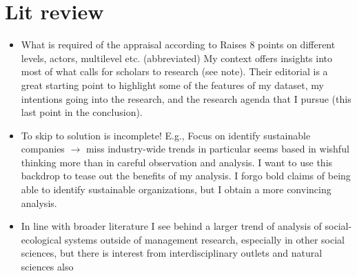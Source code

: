 	\section{Lit review}
	\begin{paracol}{2}
	\begin{itemize}
		\item What is required of the appraisal according to \citet{George2016}
			\subitem Raises 8 points on different levels, actors, multilevel etc.
				\subsubitem (abbreviated)
		\switchcolumn My context offers insights into most of what \citet{George2016} calls for scholars to research (see note). Their editorial is a great starting point to highlight some of the features of my dataset, my intentions going into the research, and the research agenda that I pursue (this last point in the conclusion).
		\switchcolumn*
		
		\item To skip to solution is incomplete!
			\subitem E.g., \citet{Ferraro2015, Slawinski2015}
			\subitem Focus on identify sustainable companies $\rightarrow$ miss industry-wide trends
		\switchcolumn \citet{Ferraro2015} in particular seems based in wishful thinking more than in careful observation and analysis. I want to use this backdrop to tease out the benefits of my analysis. I forgo bold claims of being able to identify sustainable organizations, but I obtain a more convincing analysis.
		\switchcolumn*
			
		\item In line with broader literature \citep{Reyers2018}
		\switchcolumn I see behind \citet{George2016} a larger trend of analysis of social-ecological systems outside of management research, especially in other social sciences, but there is interest from interdisciplinary outlets and natural sciences also \citep[e.g.,][]{Nature2018}
	\end{itemize}
	\end{paracol}
	
